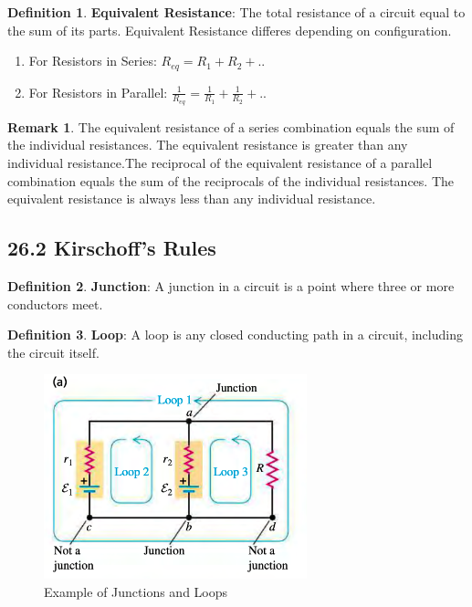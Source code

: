 \documentclass[12pt]{amsart}
\theoremstyle{definition}
\newtheorem{definition}{Definition} %
\newtheorem*{remark}{Remark}        %
\numberwithin{equation}{theorem}    %
\begin{document}
\begin{definition}
    \textbf{Equivalent Resistance}:
    The total resistance of a circuit equal to the sum of its parts.
    Equivalent Resistance differes depending on configuration.
    \begin{enumerate}
        \item For Resistors in Series: $R_{eq} = R_1 + R_2 + ..$
        \item For Resistors in Parallel: $\frac{1}{R_{eq}} = \frac{1}{R_1} + \frac{1}{R_2} + ..$
    \end{enumerate}
    \begin{remark}
        The equivalent resistance of a series combination equals the sum of 
        the individual resistances. The equivalent resistance is greater 
        than any individual resistance.The reciprocal of the equivalent 
        resistance of a parallel combination equals the sum of the reciprocals 
        of the individual resistances. The equivalent resistance is always 
        less than any individual resistance.
    \end{remark}
\end{definition}

\subsection*{26.2 Kirschoff's Rules}

\begin{definition}
    \textbf{Junction}:
    A junction in a circuit is a point where three or more conductors meet.
\end{definition}

\begin{definition}
    \textbf{Loop}:
    A loop is any closed conducting path in a circuit, including the circuit itself.
\end{definition}

\begin{figure}[H]
    \centering
    \includegraphics[width=3in,scale=0.25]{Media/Junctionloop.png}
    \caption{Example of Junctions and Loops}
    \label{Example of Junctions and Loops}
\end{figure}
\end{document}
